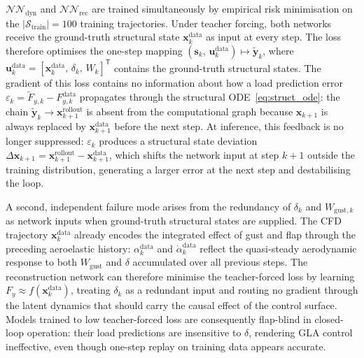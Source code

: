 $\mathcal{NN}_\mathrm{dyn}$ and $\mathcal{NN}_\mathrm{rec}$ are trained simultaneously by
empirical risk minimisation on the $|\mathcal{S}_\mathrm{train}| = 100$ training
trajectories. Under teacher forcing, both networks receive the ground-truth structural state
$\mathbf{x}_k^\mathrm{data}$ as input at every step. The loss therefore optimises the
one-step mapping $(\mathbf{s}_k,\, \mathbf{u}_k^\mathrm{data}) \mapsto \tilde{\mathbf{y}}_k$,
where $\mathbf{u}_k^\mathrm{data} = [\mathbf{x}_k^\mathrm{data},\,\delta_k,\,W_k]^\mathsf{T}$
contains the ground-truth structural states. The gradient of this loss contains no
information about how a load prediction error $\varepsilon_k = \tilde{F}_{y,k} -
F_{y,k}^\mathrm{data}$ propagates through the structural ODE~\eqref{eq:struct_ode}: the
chain $\tilde{\mathbf{y}}_k \to \mathbf{x}_{k+1}^\mathrm{rollout}$ is absent from the
computational graph because $\mathbf{x}_{k+1}$ is always replaced by $\mathbf{x}_{k+1}^\mathrm{data}$
before the next step. At inference, this feedback is no longer suppressed: $\varepsilon_k$
produces a structural state deviation $\Delta\mathbf{x}_{k+1} = \mathbf{x}_{k+1}^\mathrm{rollout}
- \mathbf{x}_{k+1}^\mathrm{data}$, which shifts the network input at step $k+1$ outside
the training distribution, generating a larger error at the next step and destabilising
the loop.

A second, independent failure mode arises from the redundancy of $\delta_k$ and
$W_{\mathrm{gust},k}$ as network inputs when ground-truth structural states are supplied.
The CFD trajectory $\mathbf{x}_k^\mathrm{data}$ already encodes the integrated effect of
gust and flap through the preceding aeroelastic history: $\alpha_k^\mathrm{data}$ and
$\dot\alpha_k^\mathrm{data}$ reflect the quasi-steady aerodynamic response to both
$W_\mathrm{gust}$ and $\delta$ accumulated over all previous steps. The reconstruction
network can therefore minimise the teacher-forced loss by learning $F_y \approx
f(\mathbf{x}_k^\mathrm{data})$, treating $\delta_k$ as a redundant input and routing no
gradient through the latent dynamics that should carry the causal effect of the control
surface. Models trained to low teacher-forced loss are consequently flap-blind in
closed-loop operation: their load predictions are insensitive to $\delta$, rendering GLA
control ineffective, even though one-step replay on training data appears accurate.

